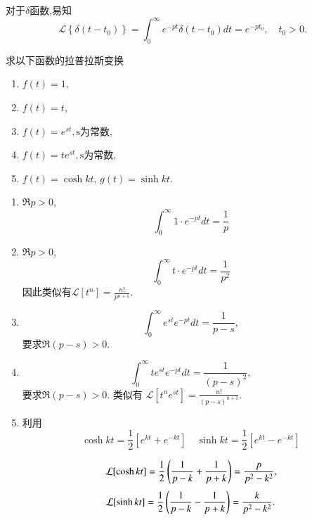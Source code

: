 对于$\delta$函数,易知
$$
\mathcal{L}\left\{\delta\left(t-t_0\right)\right\}=\int_0^{\infty} e^{-p t} \delta\left(t-t_0\right) d t=e^{-p t_0},  \quad t_0>0 .
$$
\begin{examplebox}{求以下函数的拉普拉斯变换
    \begin{enumerate}
        \item $f(t) = 1$,
        \item $f(t) = t$,
        \item $f(t) =e^{s t}, \textrm{s为常数}$,
        \item $f(t) = t e^{s t}, \textrm{s为常数}$,
        \item $f(t) = \cosh {k t}$, $g(t)= \sinh {kt}$.
    \end{enumerate}}

    \begin{enumerate}
        \item $\Re p > 0$, 
            $$\int_{0}^{\infty} 1 \cdot e^{-p t} dt = \frac{1}{p}$$
        \item  $\Re p > 0$, 
            $$\int_{0}^{\infty} t \cdot e^{-p t} dt = \frac{1}{p^2}$$
            因此类似有$\mathcal{L}[t^n] = \frac{n!}{p^{n+1}}$.
        \item $$
            \int_{0}^{\infty} e^{s t} e^{-p t} dt = \frac{1}{p-s} , 
        $$
        要求$\Re (p-s) > 0$.
        \item 
        $$
        \int_{0}^{\infty} t e^{s t} e^{-p t} dt = \frac{1}{(p-s)^2} ,
        $$
        要求$\Re (p-s) > 0$.  
    类似有 $\mathcal{L}[t^n e^{s t}] = \frac{n!}{(p-s)^{n+1}}$.
        \item 利用
        $$
         \cosh{k t}  = \frac{1}{2} \left[ e^{kt} + e^{-kt}\right] \quad 
         \sinh{k t}  = \frac{1}{2} \left[ e^{kt} - e^{-kt}\right] 
        $$

        $$
        \mathcal{L}[ \cosh{k t} ] = {\frac{1}{2}} \left( \frac{1}{p-k} + \frac{1}{p+k} \right) = \frac{p}{p^2 - k^2} ,
        $$
        $$
        \mathcal{L}[ \sinh{k t} ] = {\frac{1}{2}} \left( \frac{1}{p-k} - \frac{1}{p+k} \right) = \frac{k}{p^2 - k^2} .
        $$
    \end{enumerate}
\end{examplebox}

